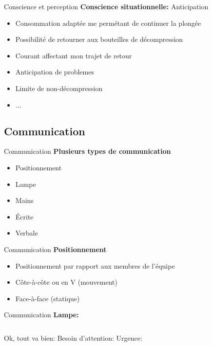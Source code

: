 \begin{frame}{Conscience et perception}  
	\textbf{Conscience situationnelle:} Anticipation
	\begin{itemize}
		\item Consommation adaptée me permétant de continuer la plongée
		\item Possibilité de retourner aux bouteilles de décompression
		\item Courant affectant mon trajet de retour
		\item Anticipation de problemes
		\item Limite de non-décompression
		\item ...
	\end{itemize}
\end{frame}

\subsection{Communication}

\begin{frame}{Communication}  
	\textbf{Plusieurs types de communication}
	\begin{itemize}
		\item Positionnement
		\item Lampe
		\item Mains
		\item Écrite
		\item Verbale
	\end{itemize}
\end{frame}

\begin{frame}{Communication}  
	\textbf{Positionnement}
	\begin{itemize}
		\item Positionnement par rapport aux membres de l'équipe
		\item Côte-à-côte ou en V (mouvement)
		\item Face-à-face (statique)
	\end{itemize}
\end{frame}

\begin{frame}{Communication}  
	\textbf{Lampe:}
	\vfill
	\begin{columns}[onlytextwidth]
			Ok, tout va bien:
			Besoin d'attention:
			Urgence:
	\end{columns}
\end{frame}

